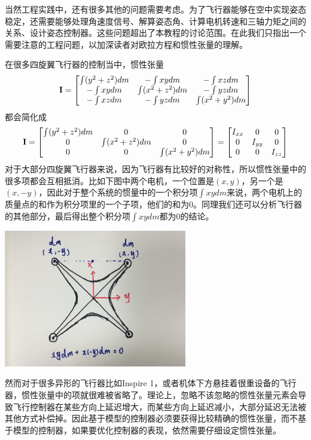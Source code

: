 \documentclass[11pt]{article}
\begin{document}
当然工程实践中，还有很多其他的问题需要考虑。为了飞行器能够在空中实现姿态稳定，还需要能够处理角速度信号、解算姿态角、计算电机转速和三轴力矩之间的关系、设计姿态控制器。这些问题超出了本教程的讨论范围。在此我们只指出一个需要注意的工程问题，以加深读者对欧拉方程和惯性张量的理解。

在很多四旋翼飞行器的控制当中，惯性张量
$$
{\bf I} = 
\begin{bmatrix}
\int (y^2+z^2) dm	&	-\int xy dm		&	-\int xz dm	\\
-\int xy dm		&	\int (x^2+z^2) dm	&	-\int yz dm	\\
-\int xz dm		&	-\int yz dm		&	\int (x^2+y^2) dm
\end{bmatrix}
$$
都会简化成
\begin{equation}\label{eqn:simpleintertia}
{\bf I} = 
\begin{bmatrix}
\int (y^2+z^2) dm	&	0		&	0	\\
0		&	\int (x^2+z^2) dm	&	0	\\
0		&	0		&	\int (x^2+y^2) dm
\end{bmatrix} = 
\begin{bmatrix}
I_{xx}	&	0		&	0	\\
0		&	I_{yy}	&	0	\\
0		&	0		&	I_{zz}
\end{bmatrix}
\end{equation}
对于大部分四旋翼飞行器来说，因为飞行器有比较好的对称性，所以惯性张量中的很多项都会互相抵消。比如下图中两个电机，一个位置是$(x,y)$，另一个是$(x,-y)$，因此对于整个系统的惯量中的一个积分项$\int xy dm$来说，两个电机上的质量点的和作为积分项里的一个子项，他们的和为0。同理我们还可以分析飞行器的其他部分，最后得出整个积分项$\int xy dm$都为0的结论。

\begin{center}
\includegraphics[width=0.6\textwidth]{images/IMG_2301.jpg}
\end{center}


然而对于很多异形的飞行器比如Inspire 1，或者机体下方悬挂着很重设备的飞行器，惯性张量中的项就很难被省略了。理论上，忽略不该忽略的惯性张量元素会导致飞行控制器在某些方向上延迟增大，而某些方向上延迟减小，大部分延迟无法被其他方式补偿掉。因此基于模型的控制器必须要获得比较精确的惯性张量，而不基于模型的控制器，如果要优化控制器的表现，依然需要仔细设定惯性张量。
\end{document}
